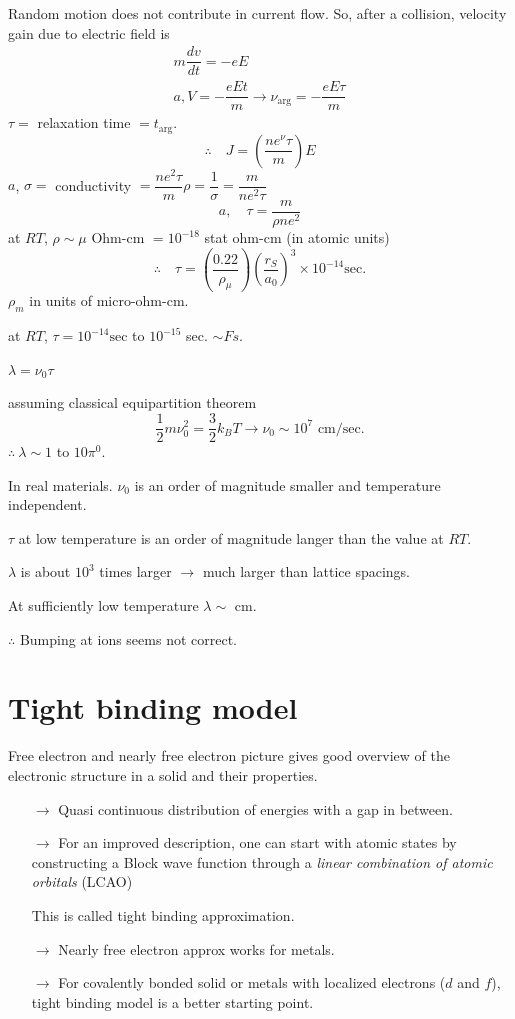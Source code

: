 Random motion does not contribute in current flow. So, after a collision, velocity gain due to electric field is
\begin{gather*}
m\dfrac{dv}{dt}=-eE\\
a, V=-\dfrac{eEt}{m}\to \nu_{\text{arg}}=-\dfrac{eE\tau}{m}
\end{gather*}
$\tau=$ relaxation time $=t_{\text{arg}}$.
$$
\therefore\quad J=\left(\dfrac{ne^{\nu}\tau}{m}\right)E
$$
$a$, $\sigma=$ conductivity $=\dfrac{ne^{2}\tau}{m}$\quad $\rho=\dfrac{1}{\sigma}=\dfrac{m}{ne^{2}\tau}$
$$
a,\quad \tau = \dfrac{m}{\rho ne^{2}}
$$
at $RT$, $\rho\sim\mu$ Ohm-cm $=10^{-18}$ stat ohm-cm (in atomic units)
$$
\therefore\quad \tau=\left(\dfrac{0.22}{\rho_{\mu}}\right)\left(\dfrac{r_{S}}{a_{0}}\right)^{3}\times 10^{-14}\text{sec.}
$$
$\rho_{m}$ in units of micro-ohm-cm.

at $RT$, $\tau=10^{-14}\text{sec}$ to $10^{-15}$ sec. $\sim Fs$.

$\lambda=\nu_{0}\tau$

assuming classical equipartition theorem
$$
\frac{1}{2}m\nu^{2}_{0}=\dfrac{3}{2}k_{B}T\to \nu_{0}\sim 10^{7}\text{ cm/sec.}
$$
$\therefore \ \lambda \sim 1$ to $10\pi^{0}$.

In real materials. $\nu_{0}$ is an order of magnitude smaller and temperature independent.

$\tau$ at low temperature is an order of magnitude langer than the value at $RT$.

$\lambda$ is about $10^{3}$ times larger $\to$ much larger than lattice spacings.

At sufficiently low temperature $\lambda\sim\text{ cm}$.

$\therefore$ Bumping at ions seems not correct.

\section*{Tight binding model}

Free electron and nearly free electron picture gives good overview of the electronic structure in a solid and their properties.
\begin{itemize}
\itemsep=0pt
\item[$\to$] Quasi continuous distribution of energies with a gap in between.

\item[$\to$] For an improved description, one can start with atomic states by constructing a Block wave function through a {\em linear combination of atomic orbitals} (LCAO) 

This is called tight binding approximation.

\item[$\to$] Nearly free electron approx works for metals.

\item[$\to$] For covalently bonded solid or metals with localized electrons ($d$ and $f$), tight binding model is a better starting point.
\end{itemize} 

